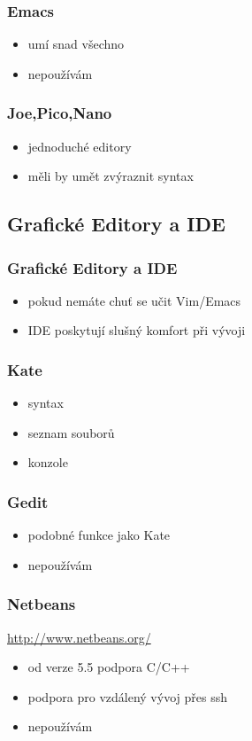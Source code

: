 	\begin{frame}
		\frametitle{Emacs}
		\begin{itemize}
			\item{umí snad všechno}
			\item{nepoužívám}
		\end{itemize}
	\end{frame}

	\begin{frame}
		\frametitle{Joe,Pico,Nano}
		\begin{itemize}
			\item{jednoduché editory}
			\item{měli by umět zvýraznit syntax}
		\end{itemize}
	\end{frame}

	\subsection{Grafické Editory a IDE}

	\begin{frame}
		\frametitle{Grafické Editory a IDE}
		\begin{itemize}
			\item{pokud nemáte chuť se učit Vim/Emacs}
			\item{IDE poskytují slušný komfort při vývoji}
		\end{itemize}
	\end{frame}

	\begin{frame}
		\frametitle{Kate}
		\begin{itemize}
			\item{syntax}
			\item{seznam souborů}
			\item{konzole}
		\end{itemize}
	\end{frame}

	\begin{frame}
		\frametitle{Gedit}
		\begin{itemize}
			\item{podobné funkce jako Kate}
			\item{nepoužívám}
		\end{itemize}
	\end{frame}

	\begin{frame}
		\frametitle{Netbeans}
		\url{http://www.netbeans.org/}
		\begin{itemize}
			\item{od verze 5.5 podpora C/C++}
			\item{podpora pro vzdálený vývoj přes ssh}
			\item{nepoužívám}
		\end{itemize}
	\end{frame}

